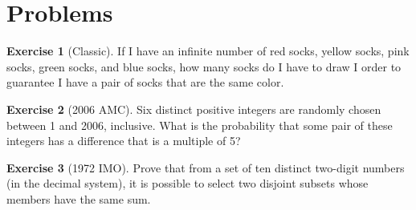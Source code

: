 \documentclass[l1pt]{article}
\theoremstyle{plain}
\theoremstyle{definition}
\newtheorem{exercise}{Exercise}[section]
\theoremstyle{remark}
\begin{document}
\section{Problems}

\begin{exercise}[Classic]
If I have an infinite number of red socks, yellow socks, pink socks, green socks, and blue socks, how many socks do I have to draw I order to guarantee I have a pair of socks that are the same color.
\end{exercise}

\begin{exercise}[2006 AMC]
 Six distinct positive integers are randomly chosen between 1 and 2006, inclusive. What is the probability that some pair of these integers has a difference that is a multiple of 5?
\end{exercise}

\begin{exercise}[1972 IMO]
Prove that from a set of ten distinct two-digit numbers (in the decimal system), it is possible to select two disjoint subsets whose members have the same sum.
\end{exercise}
\end{document}
